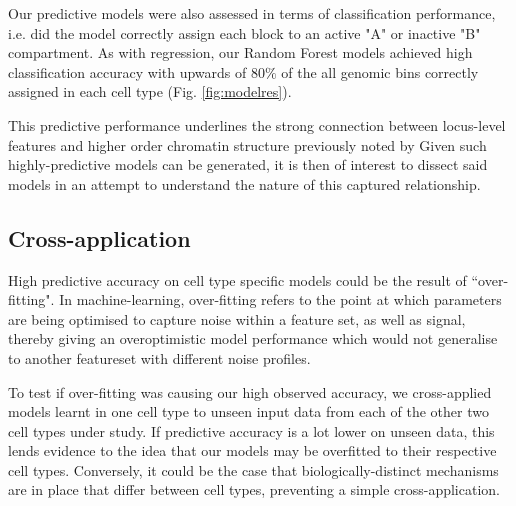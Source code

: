 \documentclass[a4paper,11pt,oneside]{book}
\begin{document}
Our predictive models were also assessed in terms of classification performance, i.e. did the model correctly assign each block to an active "A" or inactive "B" compartment. As with regression, our Random Forest models achieved high classification accuracy with upwards of $80\%$ of the all genomic bins correctly assigned in each cell type (Fig. \ref{fig:modelres}). 

This predictive performance underlines the strong connection between locus-level features and higher order chromatin structure previously noted by \citet{Lieberman2009} Given such highly-predictive models can be generated, it is then of interest to dissect said models in an attempt to understand the nature of this captured relationship.

\subsection{Cross-application}

High predictive accuracy on cell type specific models could be the result of ``over-fitting". In machine-learning, over-fitting refers to the point at which parameters are being optimised to capture noise within a feature set, as well as signal, thereby giving an overoptimistic model performance which would not generalise to another featureset with different noise profiles.

To test if over-fitting was causing our high observed accuracy, we cross-applied models learnt in one cell type to unseen input data from each of the other two cell types under study. If predictive accuracy is a lot lower on unseen data, this lends evidence to the idea that our models may be overfitted to their respective cell types. Conversely, it could be the case that biologically-distinct mechanisms are in place that differ between cell types, preventing a simple cross-application.
\end{document}

